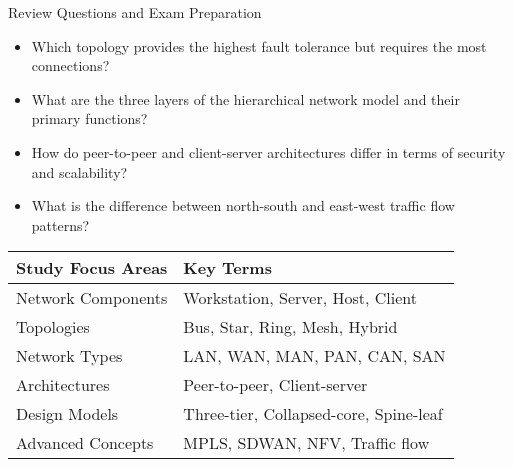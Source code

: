 \documentclass[aspectratio=169]{beamer}
\begin{document}
	\begin{frame}{Review Questions and Exam Preparation}
		\begin{itemize}
			\item Which topology provides the highest fault tolerance but requires the most connections?
			\item What are the three layers of the hierarchical network model and their primary functions?
			\item How do peer-to-peer and client-server architectures differ in terms of security and scalability?
			\item What is the difference between north-south and east-west traffic flow patterns?
		\end{itemize}
		
		\begin{center}
			\begin{tabular}{ll}
				\toprule
				\textbf{Study Focus Areas} & \textbf{Key Terms} \\
				\midrule
				Network Components & Workstation, Server, Host, Client \\
				Topologies & Bus, Star, Ring, Mesh, Hybrid \\
				Network Types & LAN, WAN, MAN, PAN, CAN, SAN \\
				Architectures & Peer-to-peer, Client-server \\
				Design Models & Three-tier, Collapsed-core, Spine-leaf \\
				Advanced Concepts & MPLS, SDWAN, NFV, Traffic flow \\
				\bottomrule
			\end{tabular}
		\end{center}
	\end{frame}
	
\end{document}
